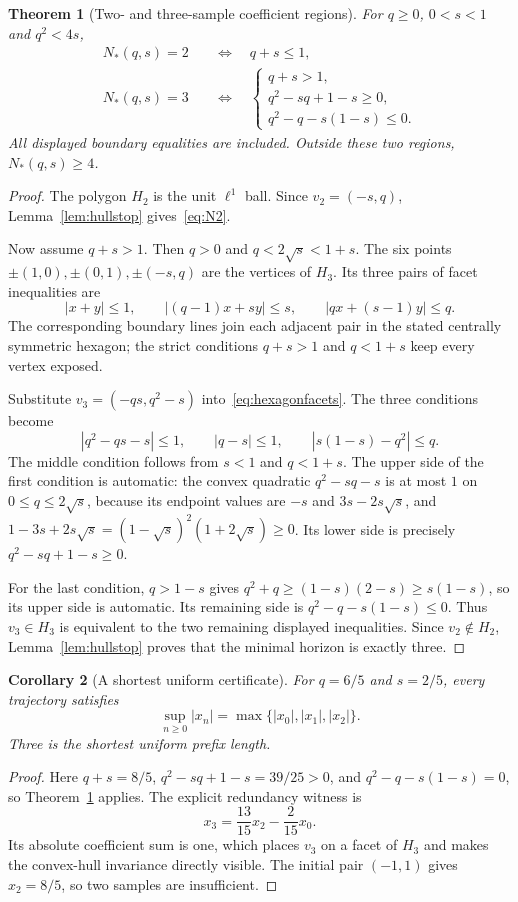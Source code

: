 \documentclass[11pt,a4paper]{article}
\newtheorem{theorem}{Theorem}\newtheorem{proposition}[theorem]{Proposition}\newtheorem{lemma}[theorem]{Lemma}\newtheorem{corollary}[theorem]{Corollary}\theoremstyle{definition}\newtheorem{definition}[theorem]{Definition}\newtheorem{example}[theorem]{Example}
\begin{document}
\begin{theorem}[Two- and three-sample coefficient regions]\label{thm:minimalregions}
For $q\ge0$, $0<s<1$ and $q^2<4s$,
\begin{align}
 N_*(q,s)=2
 &\quad\Longleftrightarrow\quad q+s\le1,\label{eq:N2}\\
 N_*(q,s)=3
 &\quad\Longleftrightarrow\quad
 \begin{cases}
 q+s>1,\\
 q^2-sq+1-s\ge0,\\
 q^2-q-s(1-s)\le0.
 \end{cases}\label{eq:N3}
\end{align}
All displayed boundary equalities are included. Outside these two regions,
$N_*(q,s)\ge4$.
\end{theorem}
\begin{proof}
The polygon $H_2$ is the unit $\ell^1$ ball. Since $v_2=(-s,q)$,
Lemma~\ref{lem:hullstop} gives~\eqref{eq:N2}.

Now assume $q+s>1$. Then $q>0$ and
$q<2\sqrt s<1+s$. The six points
$\pm(1,0),\pm(0,1),\pm(-s,q)$ are the vertices of $H_3$.
Its three pairs of facet inequalities are
\begin{equation}\label{eq:hexagonfacets}
 |x+y|\le1,\qquad |(q-1)x+sy|\le s,\qquad
 |qx+(s-1)y|\le q.
\end{equation}
The corresponding boundary lines join each adjacent pair in the stated
centrally symmetric hexagon; the strict conditions $q+s>1$ and
$q<1+s$ keep every vertex exposed.

Substitute $v_3=(-qs,q^2-s)$ into~\eqref{eq:hexagonfacets}. The three
conditions become
\[
 |q^2-qs-s|\le1,\qquad |q-s|\le1,\qquad
 |s(1-s)-q^2|\le q.
\]
The middle condition follows from $s<1$ and $q<1+s$.
The upper side of the first condition is automatic: the convex quadratic
$q^2-sq-s$ is at most $1$ on $0\le q\le2\sqrt s$, because its endpoint
values are $-s$ and $3s-2s\sqrt s$, and
$1-3s+2s\sqrt s=(1-\sqrt s)^2(1+2\sqrt s)\ge0$.
Its lower side is precisely $q^2-sq+1-s\ge0$.

For the last condition, $q>1-s$ gives
$q^2+q\ge(1-s)(2-s)\ge s(1-s)$, so its upper side is automatic.
Its remaining side is $q^2-q-s(1-s)\le0$.
Thus $v_3\in H_3$ is equivalent to the two remaining displayed
inequalities. Since $v_2\notin H_2$, Lemma~\ref{lem:hullstop} proves
that the minimal horizon is exactly three.
\end{proof}

\begin{corollary}[A shortest uniform certificate]\label{cor:threeexact}
For $q=6/5$ and $s=2/5$, every trajectory satisfies
\[
 \boxed{\sup_{n\ge0}|x_n|=\max\{|x_0|,|x_1|,|x_2|\}.}
\]
Three is the shortest uniform prefix length.
\end{corollary}
\begin{proof}
Here $q+s=8/5$, $q^2-sq+1-s=39/25>0$, and
$q^2-q-s(1-s)=0$, so Theorem~\ref{thm:minimalregions} applies.
The explicit redundancy witness is
\[
 x_3=\frac{13}{15}x_2-\frac{2}{15}x_0.
\]
Its absolute coefficient sum is one, which places $v_3$ on a facet of
$H_3$ and makes the convex-hull invariance directly visible.
The initial pair $(-1,1)$ gives $x_2=8/5$, so two samples are insufficient.
\end{proof}
\end{document}
